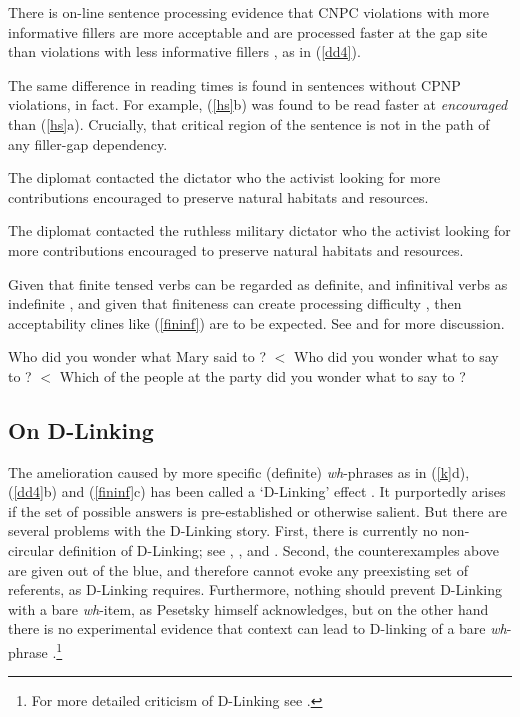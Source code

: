 \documentclass[output=paper
	        ,collection
	        ,collectionchapter
 	        ,biblatex
                ,babelshorthands
                ,newtxmath
                ,draftmode
                ,colorlinks, citecolor=brown
]{langscibook}
\begin{document}
\indent
There is on-line sentence processing evidence that   CNPC   violations  with more informative  fillers are more acceptable and are processed faster at the gap site than violations with less informative fillers \citep{hofsaglang}, as in  (\ref{dd4}).
 
\eal \label{dd4}
\zl



\noindent
The same difference in reading times  is found in sentences without CPNP violations, in fact. For example,  (\ref{hs}b) was found to be read faster at \emph{encouraged} than (\ref{hs}a). Crucially, that critical region of the sentence is not in the path of any filler-gap dependency.
 
\eal \label{hs}
 \ex The diplomat contacted the dictator who the activist looking for more contributions encouraged to preserve natural habitats and resources.
 
 \ex The diplomat contacted the ruthless military dictator who the activist looking for more contributions encouraged to preserve natural habitats and resources.
 \zl



Given that  finite tensed verbs can be regarded as definite, and infinitival verbs as indefinite \citep{partee84}, and given that finiteness can create processing difficulty 
 \citep{kluender92,gibson0000}, then acceptability clines like 
(\ref{fininf}) are to be expected. See \citet[Chapter 5]{levhubook} and \citet[308]{levine17} for more discussion.

\eal \label{fininf}
\ex Who did you wonder what Mary said to \spc?  $<$
\ex Who did you wonder what to say to \spc?  $<$
\ex Which of the people at the party did you wonder what to say to \spc? 
\zl

\subsection{On D-Linking}

The amelioration caused by more specific (definite) \emph{wh}-phrases as in  (\ref{k}d), (\ref{dd4}b) and (\ref{fininf}c)  has been called a `D-Linking' effect  \citep{pesetskydlink,pesetskybook}. It purportedly arises if the set of possible answers is pre-established or otherwise salient. But there are several problems with the D-Linking story.   First, there is currently no non-circular definition of D-Linking; see 
\citet[16]{pesetskybook},
 \citet[247--250]{ginzsag}, 
 \citet[33, 39]{chung94} and
\citet[242, 268--271]{levhubook}. Second, the counterexamples above are given out of the blue, and therefore cannot evoke any preexisting set of referents, as D-Linking 
requires.   Furthermore, nothing should prevent D-Linking with a bare \emph{wh}-item, as Pesetsky himself acknowledges, but on the other hand there is no experimental evidence that context can lead to D-linking of a bare \emph{wh}-phrase \citep{sprousediss07,villata}.\footnote{For more detailed criticism of D-Linking see \citet{hof2007}.}
\end{document}
